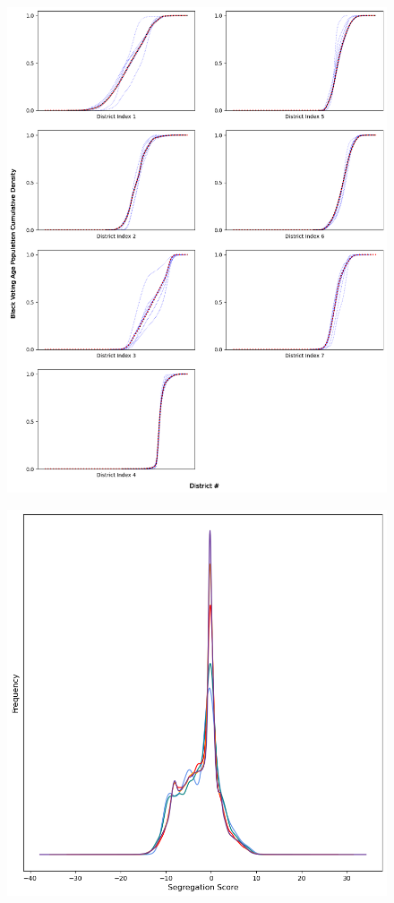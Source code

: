 \documentclass{article}
\begin{document}
\begin{figure}
    \centering
    \includegraphics[scale=.6]{images/bvap_kde_convergence.png}
\end{figure}

\begin{figure}
    \centering
    \includegraphics[scale=.6]{images/asu_hist_convergence.png}
\end{figure}
\end{document}
